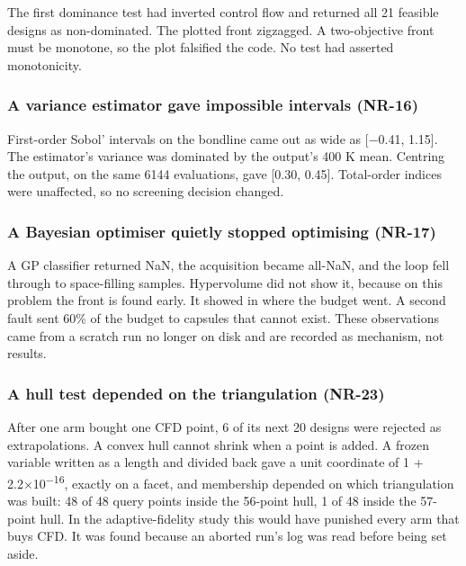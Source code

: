 \documentclass[
  a4paper,
  11pt]{article}
\begin{document}
The first dominance test had inverted control flow and returned all 21
feasible designs as non-dominated. The plotted front zigzagged. A
two-objective front must be monotone, so the plot falsified the code. No
test had asserted monotonicity.

\subsubsection{A variance estimator gave impossible intervals
(NR-16)}\label{a-variance-estimator-gave-impossible-intervals-nr-16}

First-order Sobol' intervals on the bondline came out as wide as
{[}−0.41, 1.15{]}. The estimator's variance was dominated by the
output's 400 K mean. Centring the output, on the same 6144 evaluations,
gave {[}0.30, 0.45{]}. Total-order indices were unaffected, so no
screening decision changed.

\subsubsection{A Bayesian optimiser quietly stopped optimising
(NR-17)}\label{a-bayesian-optimiser-quietly-stopped-optimising-nr-17}

A GP classifier returned NaN, the acquisition became all-NaN, and the
loop fell through to space-filling samples. Hypervolume did not show it,
because on this problem the front is found early. It showed in where the
budget went. A second fault sent 60\% of the budget to capsules that
cannot exist. These observations came from a scratch run no longer on
disk and are recorded as mechanism, not results.

\subsubsection{A hull test depended on the triangulation
(NR-23)}\label{a-hull-test-depended-on-the-triangulation-nr-23}

After one arm bought one CFD point, 6 of its next 20 designs were
rejected as extrapolations. A convex hull cannot shrink when a point is
added. A frozen variable written as a length and divided back gave a
unit coordinate of 1 + 2.2×10\textsuperscript{−16}, exactly on a facet,
and membership depended on which triangulation was built: 48 of 48 query
points inside the 56-point hull, 1 of 48 inside the 57-point hull. In
the adaptive-fidelity study this would have punished every arm that buys
CFD. It was found because an aborted run's log was read before being set
aside.
\end{document}
